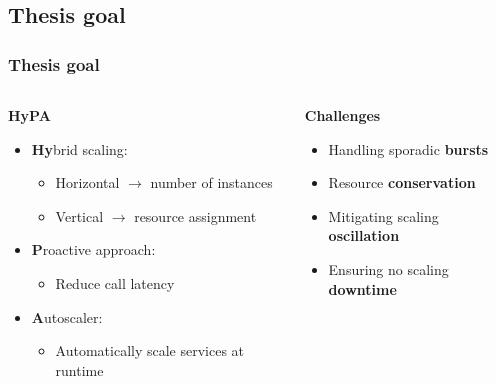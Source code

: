 \documentclass[11pt,t,usepdftitle=false,aspectratio=169]{beamer}
\begin{document}
\subsection{Thesis goal}
\begin{frame}
	\frametitle{Thesis goal}
	
	\begin{columns}
		\begin{column}{0.55\textwidth}
			\begin{block}{\textbf{HyPA}}
				\begin{itemize}
					\item \textbf{\color{uibkorange} Hy}brid scaling:
					\begin{itemize}
						\item Horizontal $\rightarrow$ number of instances
						\item Vertical $\rightarrow$ resource assignment
					\end{itemize}
					\item \textbf{\color{uibkorange} P}roactive approach:
					\begin{itemize}
						\item Reduce call latency
					\end{itemize}
					\item \textbf{\color{uibkorange} A}utoscaler:
					\begin{itemize}
						\item Automatically scale services at runtime
					\end{itemize}
				\end{itemize}
			\end{block}
		\end{column}
		
		\begin{column}{0.45\textwidth}
			\begin{block}{\textbf{Challenges}}
				\begin{itemize}
					\item Handling sporadic \textbf{\color{red} bursts}
					\item Resource \textbf{\color{red} conservation}
					\item Mitigating scaling \textbf{\color{red} oscillation}
					\item Ensuring no scaling \textbf{\color{red} downtime}
				\end{itemize}
			\end{block}
		\end{column}
	\end{columns}
\end{frame}
\end{document}
